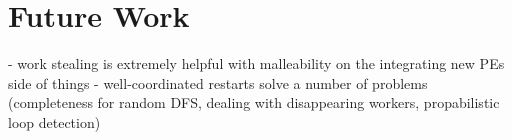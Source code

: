 \documentclass[enabledeprecatedfontcommands,12pt,a4paper,twoside]{scrartcl}
\numberwithin{equation}{section}
\begin{document}


\section{Future Work}

- work stealing is extremely helpful with malleability on the integrating new PEs side of things
- well-coordinated restarts solve a number of problems (completeness for random DFS, dealing with disappearing workers, propabilistic loop detection)



\clearpage




\end{document}
